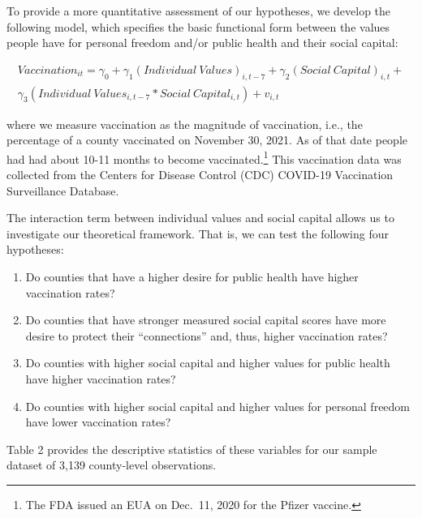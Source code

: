\documentclass[
]{article}
\begin{document}
To provide a more quantitative assessment of our hypotheses, we develop
the following model, which specifies the basic functional form between
the values people have for personal freedom and/or public health and
their social capital:

\[
\begin{aligned}
Vaccination_{it}=\gamma_0+\gamma_1(Individual\ Values)_{i,t-7}+\gamma_2(Social\ Capital)_{i,t}+\\ \gamma_3(Individual\ Values_{i, t-7}*Social\ Capital_{i,t}) + v_{i,t}
\end{aligned}
\]

where we measure vaccination as the magnitude of vaccination, i.e., the
percentage of a county vaccinated on November 30, 2021. As of that date
people had had about 10-11 months to become vaccinated.\footnote{The FDA
  issued an EUA on Dec.~11, 2020 for the Pfizer vaccine.} This
vaccination data was collected from the Centers for Disease Control
(CDC) COVID-19 Vaccination Surveillance Database.

The interaction term between individual values and social capital allows
us to investigate our theoretical framework. That is, we can test the
following four hypotheses:

\begin{enumerate}
\def\labelenumi{\arabic{enumi}.}
\item
  Do counties that have a higher desire for public health have higher
  vaccination rates?
\item
  Do counties that have stronger measured social capital scores have
  more desire to protect their ``connections'' and, thus, higher
  vaccination rates?
\item
  Do counties with higher social capital and higher values for public
  health have higher vaccination rates?
\item
  Do counties with higher social capital and higher values for personal
  freedom have lower vaccination rates?
\end{enumerate}

Table 2 provides the descriptive statistics of these variables for our
sample dataset of 3,139 county-level observations.
\end{document}
